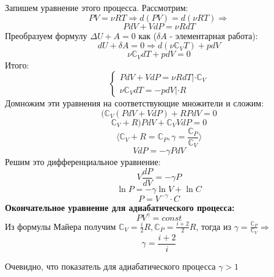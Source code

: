 \documentclass[12pt,a4paper]{report}
\begin{document}
Запишем уравнение этого процесса. Рассмотрим:
\[PV = \nu RT \Rightarrow d(PV) = d(\nu RT) \Rightarrow \]
\[ PdV + VdP = \nu R dT \]
Преобразуем формулу $\Delta U + A = 0$ как ($\delta A$ - элементарная работа):
\[ dU + \delta A = 0 \Rightarrow d(\nu \mathbb{C}_V T) + pdV \]
\[ \nu \mathbb{C}_VdT +pdV = 0\]
Итого:
\begin{equation*}
    \begin{cases}
        PdV + VdP = \nu R dT |\cdot \mathbb{C}_V
        \\
        \nu \mathbb{C}_VdT = -pdV | \cdot R
    \end{cases}
\end{equation*}
Домножим эти уравнения на соответствующие множители и сложим:
\[(\mathbb{C}_V(PdV + VdP) + RPdV = 0 \]
\[\mathbb{C}_V + R)PdV + \mathbb{C}_VVdP = 0 \]
\[ \langle \mathbb{C}_V + R = \mathbb{C}_P, \gamma = \frac{\mathbb{C}_P}{\mathbb{C}_V} \rangle\]
\[VdP = -\gamma PdV\]
Решим это дифференциальное уравнение:
\[V \frac{dP}{dV} = -\gamma P \]
\[\ln{P} = -\gamma \ln{V} + \ln{C} \]
\[ P = V^{- \gamma} \cdot C\]
\textbf{Окончательное уравнение для адиабатического процесса:
    \[ PV^{\gamma} = const\]}
Из формулы Майера получим $\mathbb{C}_V = \frac{i}{2}R, \mathbb{C}_P = \frac{i+2}{2}R$, тогда из $\gamma = \frac{\mathbb{C}_P}{\mathbb{C}_V} \Rightarrow $
\[\gamma = \frac{i+2}{i}\]

Очевидно, что показатель для адиабатического процесса $\gamma > 1$
\end{document}
